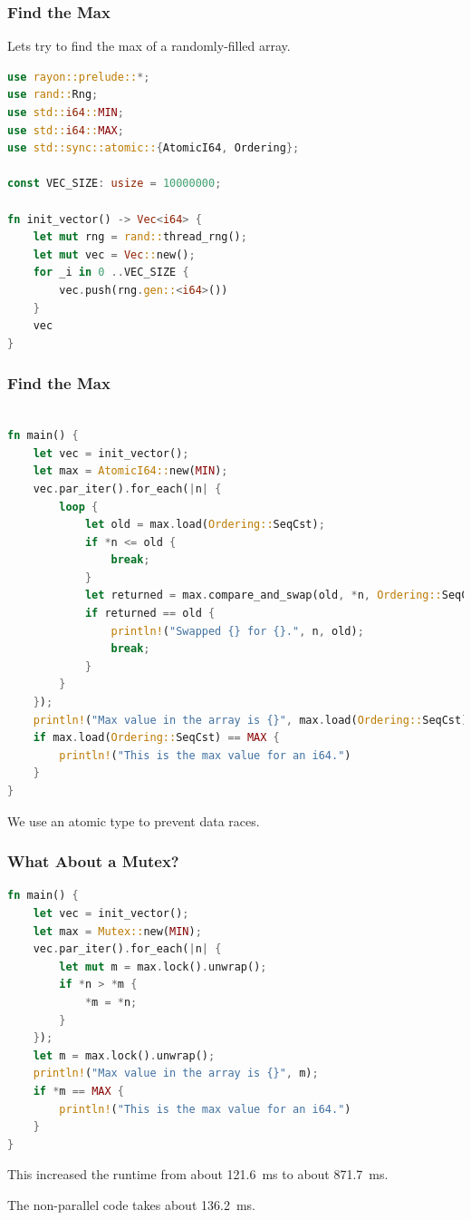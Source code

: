 \begin{frame}[fragile]
\frametitle{Find the Max}

Lets try to find the max of a randomly-filled array.

\begin{lstlisting}[language=Rust]
use rayon::prelude::*;
use rand::Rng;
use std::i64::MIN;
use std::i64::MAX;
use std::sync::atomic::{AtomicI64, Ordering};

const VEC_SIZE: usize = 10000000;

fn init_vector() -> Vec<i64> {
    let mut rng = rand::thread_rng();
    let mut vec = Vec::new();
    for _i in 0 ..VEC_SIZE {
        vec.push(rng.gen::<i64>())
    }
    vec
}

\end{lstlisting}
\end{frame}
\begin{frame}[fragile]
\frametitle{Find the Max}


\begin{lstlisting}[language=Rust]

fn main() {
    let vec = init_vector();
    let max = AtomicI64::new(MIN);
    vec.par_iter().for_each(|n| {
        loop {
            let old = max.load(Ordering::SeqCst);
            if *n <= old {
                break;
            }
            let returned = max.compare_and_swap(old, *n, Ordering::SeqCst);
            if returned == old {
                println!("Swapped {} for {}.", n, old);
                break;
            }
        }
    });
    println!("Max value in the array is {}", max.load(Ordering::SeqCst));
    if max.load(Ordering::SeqCst) == MAX {
        println!("This is the max value for an i64.")
    }
}
\end{lstlisting}

We use an atomic type to prevent data races.

\end{frame}


\begin{frame}[fragile]
\frametitle{What About a Mutex?}

\begin{lstlisting}[language=Rust]
fn main() {
    let vec = init_vector();
    let max = Mutex::new(MIN);
    vec.par_iter().for_each(|n| {
        let mut m = max.lock().unwrap();
        if *n > *m {
            *m = *n;
        }
    });
    let m = max.lock().unwrap();
    println!("Max value in the array is {}", m);
    if *m == MAX {
        println!("This is the max value for an i64.")
    }
}
\end{lstlisting}

This increased the runtime from about 121.6~ms to about 871.7~ms.

 The non-parallel code takes about 136.2~ms.

\end{frame}


